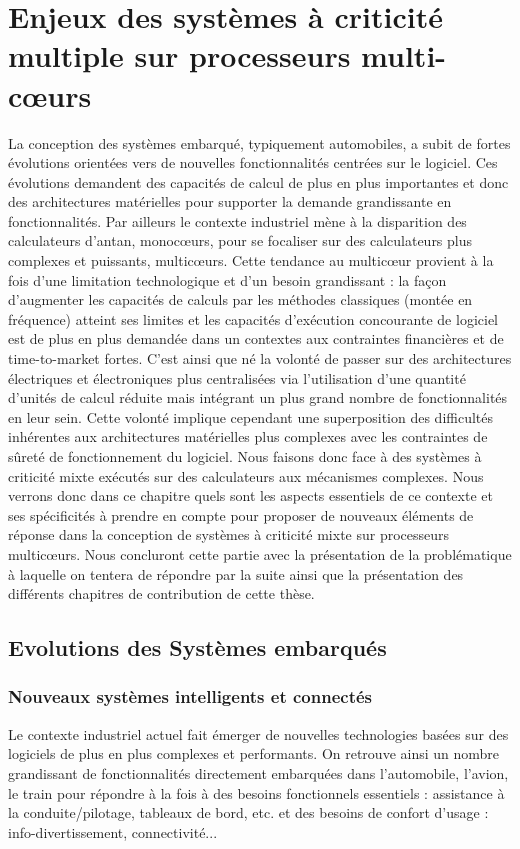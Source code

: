 \documentclass[french, a4paper, 11pt, twoside, pdftex]{StyleThese}
\begin{document}
\setcounter{chapter}{1}
\dominitoc
\faketableofcontents
\fi

\chapter{Enjeux des systèmes à criticité multiple sur processeurs multi-c\oe{}urs}
\minitoc

La conception des systèmes embarqué, typiquement automobiles, a subit de fortes évolutions orientées vers de nouvelles fonctionnalités centrées sur le logiciel. Ces évolutions demandent des capacités de calcul de plus en plus importantes et donc des architectures matérielles pour supporter la demande grandissante en fonctionnalités. Par ailleurs le contexte industriel mène à la disparition des calculateurs d'antan, monoc\oe{}urs, pour se focaliser sur des calculateurs plus complexes et puissants, multic\oe{}urs. Cette tendance au multic\oe{}ur provient à la fois d'une limitation technologique et d'un besoin grandissant : la façon d'augmenter les capacités de calculs par les méthodes classiques (montée en fréquence) atteint ses limites et les capacités d'exécution concourante de logiciel est de plus en plus demandée dans un contextes aux contraintes financières et de time-to-market fortes. C'est ainsi que né la volonté de passer sur des architectures électriques et électroniques plus centralisées via l'utilisation d'une quantité d'unités de calcul réduite mais intégrant un plus grand nombre de fonctionnalités en leur sein. Cette volonté implique cependant une superposition des difficultés inhérentes aux architectures matérielles plus complexes avec les contraintes de sûreté de fonctionnement du logiciel. Nous faisons donc face à des systèmes à criticité mixte exécutés sur des calculateurs aux mécanismes complexes. Nous verrons donc dans ce chapitre quels sont les aspects essentiels de ce contexte et ses spécificités à prendre en compte pour proposer de nouveaux éléments de réponse dans la conception de systèmes à criticité mixte sur processeurs multic\oe{}urs. Nous concluront cette partie avec la présentation de la problématique à laquelle on tentera de répondre par la suite ainsi que la présentation des différents chapitres de contribution de cette thèse.

\section{Evolutions des Systèmes embarqués}
	\subsection{Nouveaux systèmes intelligents et connectés}
		Le contexte industriel actuel fait émerger de nouvelles technologies basées sur des logiciels de plus en plus complexes et performants. On retrouve ainsi un nombre grandissant de fonctionnalités directement embarquées dans l'automobile, l'avion, le train pour répondre à la fois à des besoins fonctionnels essentiels : assistance à la conduite/pilotage, tableaux de bord, etc. et des besoins de confort d'usage : info-divertissement, connectivité... 
		
\end{document}
